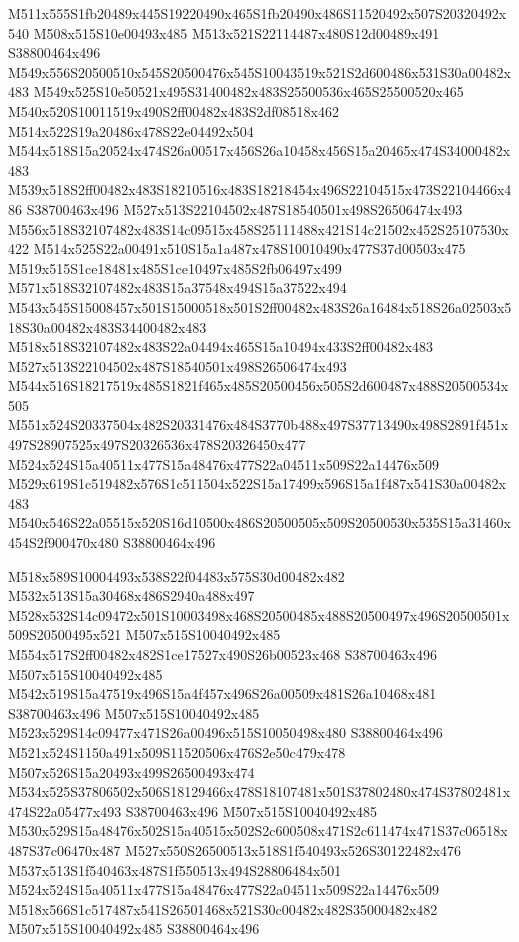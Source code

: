 \documentclass{article}
\begin{document}
\begin{multicols}{2}
M511x555S1fb20489x445S19220490x465S1fb20490x486S11520492x507S20320492x540 M508x515S10e00493x485 M513x521S22114487x480S12d00489x491 S38800464x496 M549x556S20500510x545S20500476x545S10043519x521S2d600486x531S30a00482x483 M549x525S10e50521x495S31400482x483S25500536x465S25500520x465 M540x520S10011519x490S2ff00482x483S2df08518x462 M514x522S19a20486x478S22e04492x504 M544x518S15a20524x474S26a00517x456S26a10458x456S15a20465x474S34000482x483 M539x518S2ff00482x483S18210516x483S18218454x496S22104515x473S22104466x486 S38700463x496 M527x513S22104502x487S18540501x498S26506474x493 M556x518S32107482x483S14c09515x458S25111488x421S14c21502x452S25107530x422 M514x525S22a00491x510S15a1a487x478S10010490x477S37d00503x475 M519x515S1ce18481x485S1ce10497x485S2fb06497x499 M571x518S32107482x483S15a37548x494S15a37522x494 M543x545S15008457x501S15000518x501S2ff00482x483S26a16484x518S26a02503x518S30a00482x483S34400482x483 M518x518S32107482x483S22a04494x465S15a10494x433S2ff00482x483 M527x513S22104502x487S18540501x498S26506474x493 M544x516S18217519x485S1821f465x485S20500456x505S2d600487x488S20500534x505 M551x524S20337504x482S20331476x484S3770b488x497S37713490x498S2891f451x497S28907525x497S20326536x478S20326450x477 M524x524S15a40511x477S15a48476x477S22a04511x509S22a14476x509 M529x619S1c519482x576S1c511504x522S15a17499x596S15a1f487x541S30a00482x483 M540x546S22a05515x520S16d10500x486S20500505x509S20500530x535S15a31460x454S2f900470x480 S38800464x496


M518x589S10004493x538S22f04483x575S30d00482x482 M532x513S15a30468x486S2940a488x497 M528x532S14c09472x501S10003498x468S20500485x488S20500497x496S20500501x509S20500495x521 M507x515S10040492x485 M554x517S2ff00482x482S1ce17527x490S26b00523x468 S38700463x496 M507x515S10040492x485 M542x519S15a47519x496S15a4f457x496S26a00509x481S26a10468x481 S38700463x496 M507x515S10040492x485 M523x529S14c09477x471S26a00496x515S10050498x480 S38800464x496 M521x524S1150a491x509S11520506x476S2e50c479x478 M507x526S15a20493x499S26500493x474 M534x525S37806502x506S18129466x478S18107481x501S37802480x474S37802481x474S22a05477x493 S38700463x496 M507x515S10040492x485 M530x529S15a48476x502S15a40515x502S2c600508x471S2c611474x471S37c06518x487S37c06470x487 M527x550S26500513x518S1f540493x526S30122482x476 M537x513S1f540463x487S1f550513x494S28806484x501 M524x524S15a40511x477S15a48476x477S22a04511x509S22a14476x509 M518x566S1c517487x541S26501468x521S30c00482x482S35000482x482 M507x515S10040492x485 S38800464x496


\end{multicols}
\end{document}
